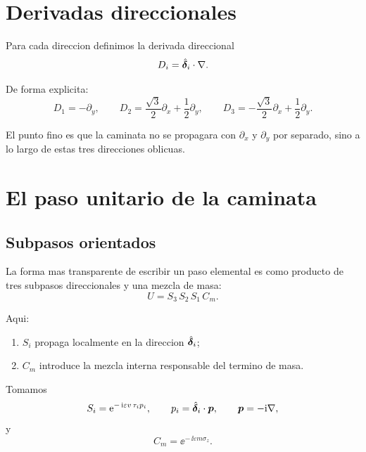 \section{Derivadas direccionales}

Para cada direccion definimos la derivada direccional
\begin{equation}
D_i = \hat{\bm{\delta}}_i\cdot \nabla.
\label{c03:eq:Di}
\end{equation}

De forma explicita:
\begin{equation}
D_1 = -\partial_y,
\qquad
D_2 = \frac{\sqrt{3}}{2}\partial_x + \frac{1}{2}\partial_y,
\qquad
D_3 = -\frac{\sqrt{3}}{2}\partial_x + \frac{1}{2}\partial_y.
\label{c03:eq:Di-explicit}
\end{equation}

El punto fino es que la caminata no se propagara con \(\partial_x\) y \(\partial_y\) por separado, sino a lo largo de estas tres direcciones oblicuas.

\section{El paso unitario de la caminata}

\subsection{Subpasos orientados}

La forma mas transparente de escribir un paso elemental es como producto de tres subpasos direccionales y una mezcla de masa:
\begin{equation}
U = S_3\,S_2\,S_1\,C_m.
\label{c03:eq:Ufull}
\end{equation}

Aqui:

\begin{enumerate}[leftmargin=*]
  \item \(S_i\) propaga localmente en la direccion \(\hat{\bm{\delta}}_i\);
  \item \(C_m\) introduce la mezcla interna responsable del termino de masa.
\end{enumerate}

Tomamos
\begin{equation}
S_i = \mathrm{e}^{-\,\mathrm{i} \varepsilon v\, \tau_i p_i},
\qquad
p_i = \hat{\bm{\delta}}_i\cdot \bm{p},
\qquad
\bm{p} = -\mathrm{i} \nabla,
\label{c03:eq:Si}
\end{equation}
y
\begin{equation}
C_m = \ee^{-\,\ii \varepsilon m \sigma_z}.
\label{c03:eq:Cm}
\end{equation}

